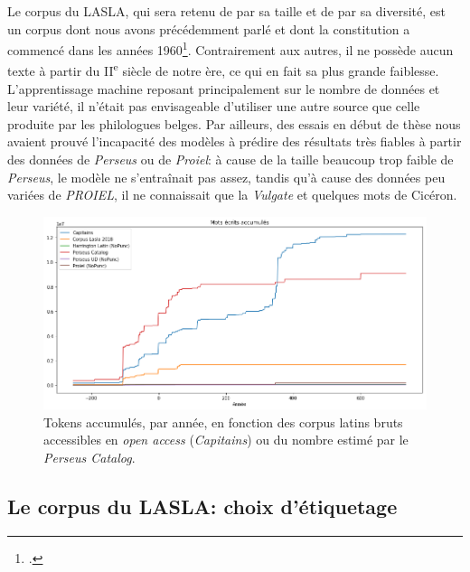 Le corpus du LASLA, qui sera retenu de par sa taille et de par sa diversité, est un corpus dont nous avons précédemment parlé et dont la constitution a commencé dans les années 1960\footcites{delatte_laboratoire_1961}{BodsonCodification1966}. Contrairement aux autres, il ne possède aucun texte à partir du II\textsuperscript{e} siècle de notre ère, ce qui en fait sa plus grande faiblesse. L'apprentissage machine reposant principalement sur le nombre de données et leur variété, il n'était pas envisageable d'utiliser une autre source que celle produite par les philologues belges. Par ailleurs, des essais en début de thèse nous avaient prouvé l'incapacité des modèles à prédire des résultats très fiables à partir des données de \textit{Perseus} ou de \textit{Proiel}: à cause de la taille beaucoup trop faible de \textit{Perseus}, le modèle ne s'entraînait pas assez, tandis qu'à cause des données peu variées de \textit{PROIEL}, il ne connaissait que la \textit{Vulgate} et quelques mots de Cicéron.

\begin{figure}
    \includegraphics[width=\linewidth]{figures/chap3/corpus/tokens_per_year.png}
    \caption{Tokens accumulés, par année, en fonction des corpus latins bruts accessibles en \textit{open access} (\textit{Capitains}) ou du nombre estimé  par le \textit{Perseus Catalog}.}
    \label{fig:lemmatisation:corpus-entrainement}
\end{figure}

\subsection{Le corpus du LASLA: choix d'étiquetage}

